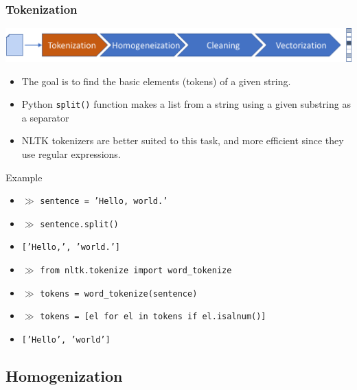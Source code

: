 \documentclass{beamer}
\begin{document}
\begin{frame}

    \frametitle{Tokenization}

    \centerline{\includegraphics[width=\textwidth]{./figs/NLPTM_tokenization.png}}

    \begin{itemize}
  
    	\item The goal is to find the basic elements (tokens) of a given string. 
    	\item Python {\tt split()} function makes a list from a string using a given substring as a separator
    	\item NLTK tokenizers are better suited to this task, and more efficient since they use regular expressions.
    	
    \end{itemize}
    
    \begin{block}{Example}
    	\begin{itemize}
    		\footnotesize
    		\item[] $\gg$ {\tt sentence = 'Hello, world.'}
    		\item[] $\gg$ {\tt sentence.split()}
    		\item[] {\tt ['Hello,', 'world.']}
    		\item[] $\gg$ {\tt from nltk.tokenize import word\_tokenize}
    		\item[] $\gg$ {\tt tokens = word\_tokenize(sentence)}
    		\item[] $\gg$ {\tt tokens = [el for el in tokens if el.isalnum()]}
    		\item[] {\tt ['Hello', 'world']}
    	
    	\end{itemize}
    \end{block}
    
\end{frame}


\subsection{Homogenization}
\end{document}
